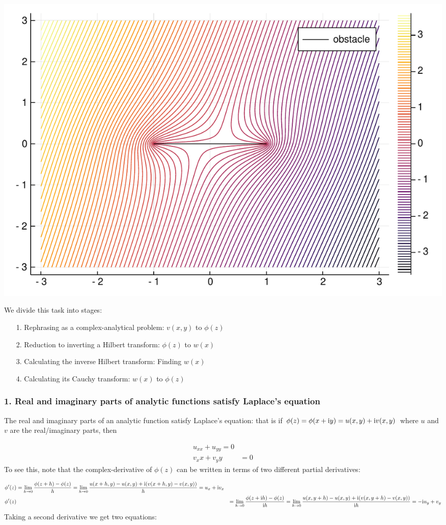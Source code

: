 \documentclass[12pt,a4paper]{article}
\def\I{ {\rm i} }
\def\addtab#1={#1\;&=}
\def\ccr{\\\addtab}
\def\addtab#1={#1\;&=}
\def\ccr{\\\addtab}
\begin{document}
\includegraphics[width=\linewidth]{figures/Lecture15_1_1.pdf}

We divide this task into stages:

\begin{itemize}
\item[1. ] Rephrasing as a complex-analytical problem: $v(x,y)$ to $\phi(z)$


\item[2. ] Reduction to inverting a Hilbert transform: $\phi(z)$ to $w(x)$


\item[3. ] Calculating the inverse Hilbert transform: Finding $w(x)$


\item[4. ] Calculating its Cauchy transform: $w(x)$ to $\phi(z)$

\end{itemize}
\subsubsection{1. Real and imaginary parts of analytic functions satisfy Laplace's equation}
The real and imaginary parts of an analytic function satisfy Laplace's equation: that is  if $\phi(z) = \phi(x + \I y) = u(x,y) + \I v(x,y)$ where $u$ and $v$ are the real/imaginary parts, then 


\begin{align*}
 u_{xx} + u_{yy}= 0 \ccr
 v_{xx} + v_{yy} = 0
\end{align*}
To see this, note that the complex-derivative of $\phi(z)$ can be written in terms of two different partial derivatives:


\begin{align*}
    \phi'(z) &= \lim_{h \rightarrow 0} {\phi(z+h) - \phi(z) \over h} = \lim_{h \rightarrow 0} {u(x+h,y)-u(x,y) + \I (v(x+h,y)-v(x,y)) \over h} = u_x + \I v_x \ccr
    \phi'(z) &= \lim_{h \rightarrow 0} {\phi(z+\I h) - \phi(z) \over \I h} = \lim_{h \rightarrow 0} {u(x,y+h)-u(x,y) + \I (v(x,y+h)-v(x,y)) \over \I h} = - \I u_y + v_y
\end{align*}
Taking a second derivative we get two equations:
\end{document}
